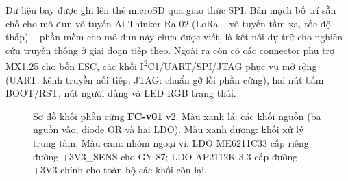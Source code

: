 Dữ liệu bay được ghi lên thẻ microSD qua giao thức SPI. Bản mạch bố trí sẵn chỗ cho mô-đun vô tuyến Ai-Thinker Ra-02 (LoRa -- vô tuyến tầm xa, tốc độ thấp) -- phần mềm cho mô-đun này chưa được viết, là kết nối dự trữ cho nghiên cứu truyền thông ở giai đoạn tiếp theo. Ngoài ra còn có các connector phụ trợ MX1.25 cho bốn ESC, các khối I\textsuperscript{2}C1/UART/SPI/JTAG phục vụ mở rộng (UART: kênh truyền nối tiếp; JTAG: chuẩn gỡ lỗi phần cứng), hai nút bấm BOOT/RST, nút người dùng và LED RGB trạng thái.

\begin{figure}[h]
\centering

\caption{Sơ đồ khối phần cứng \textbf{FC-v01} v2. Màu xanh lá: các khối nguồn (ba nguồn vào, diode OR và hai LDO). Màu xanh dương: khối xử lý trung tâm. Màu cam: nhóm ngoại vi. LDO ME6211C33 cấp riêng đường +3V3\_SENS cho GY-87; LDO AP2112K-3.3 cấp đường +3V3 chính cho toàn bộ các khối còn lại.}
\label{fig:hw-block}
\end{figure}
